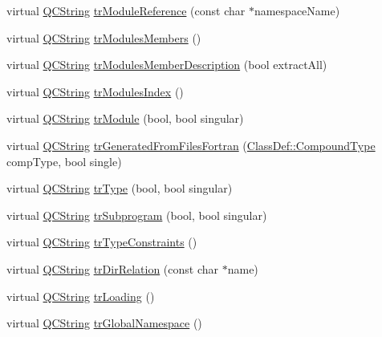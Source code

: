 \begin{DoxyCompactItemize}
\item 
virtual \mbox{\hyperlink{class_q_c_string}{Q\+C\+String}} \mbox{\hyperlink{class_translator_german_ae0c777571dbb29c718edc0502793f963}{tr\+Module\+Reference}} (const char $\ast$namespace\+Name)
\item 
virtual \mbox{\hyperlink{class_q_c_string}{Q\+C\+String}} \mbox{\hyperlink{class_translator_german_a4716a53205f0475f3269ba55df18c8cc}{tr\+Modules\+Members}} ()
\item 
virtual \mbox{\hyperlink{class_q_c_string}{Q\+C\+String}} \mbox{\hyperlink{class_translator_german_a4902c094e132773299e9a7966de86620}{tr\+Modules\+Member\+Description}} (bool extract\+All)
\item 
virtual \mbox{\hyperlink{class_q_c_string}{Q\+C\+String}} \mbox{\hyperlink{class_translator_german_ab54fd39ef008d1bb19cc22f9a2b1f5a6}{tr\+Modules\+Index}} ()
\item 
virtual \mbox{\hyperlink{class_q_c_string}{Q\+C\+String}} \mbox{\hyperlink{class_translator_german_aa4e9a466ac0ad51e393d4d025d572d2f}{tr\+Module}} (bool, bool singular)
\item 
virtual \mbox{\hyperlink{class_q_c_string}{Q\+C\+String}} \mbox{\hyperlink{class_translator_german_a864b222b989a57e263dc99de282bab9f}{tr\+Generated\+From\+Files\+Fortran}} (\mbox{\hyperlink{class_class_def_ae70cf86d35fe954a94c566fbcfc87939}{Class\+Def\+::\+Compound\+Type}} comp\+Type, bool single)
\item 
virtual \mbox{\hyperlink{class_q_c_string}{Q\+C\+String}} \mbox{\hyperlink{class_translator_german_a3d30f2857eaf842e87b2f5e97f0f8aa2}{tr\+Type}} (bool, bool singular)
\item 
virtual \mbox{\hyperlink{class_q_c_string}{Q\+C\+String}} \mbox{\hyperlink{class_translator_german_af2cd28365db67ee0377b5920d81e4a06}{tr\+Subprogram}} (bool, bool singular)
\item 
virtual \mbox{\hyperlink{class_q_c_string}{Q\+C\+String}} \mbox{\hyperlink{class_translator_german_a75377d22864cfad0cfaaa88047196ab0}{tr\+Type\+Constraints}} ()
\item 
virtual \mbox{\hyperlink{class_q_c_string}{Q\+C\+String}} \mbox{\hyperlink{class_translator_german_ae75c84f71a7b82d8d58702864d01eb41}{tr\+Dir\+Relation}} (const char $\ast$name)
\item 
virtual \mbox{\hyperlink{class_q_c_string}{Q\+C\+String}} \mbox{\hyperlink{class_translator_german_aadbd25cbf2b49a19c92def2f69856af9}{tr\+Loading}} ()
\item 
virtual \mbox{\hyperlink{class_q_c_string}{Q\+C\+String}} \mbox{\hyperlink{class_translator_german_ad47b2d87daf9478787ca318b26ad708a}{tr\+Global\+Namespace}} ()

\end{DoxyCompactItemize}
